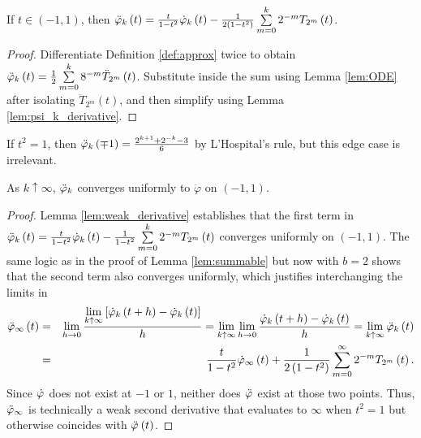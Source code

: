 \begin{lemma}
  \label{lem:second_derivative}
  If $t \in \left(-1,1\right)$, then $\ddotvarphi[t]{k} = \frac{t}{1 - t^2} \dotvarphi[t]{k} - \frac{1}{2\left(1 - t^2\right)} \sum\limits_{m = 0}^k 2^{-m} \TT[t]{m}$.
\end{lemma}
\begin{proof}
  Differentiate Definition \ref{def:approx} twice to obtain $\ddotvarphi[t]{k} = \frac{1}{2} \sum\limits_{m = 0}^k 8^{-m} \ddot{T}_{2^m}\left(t\right)$. Substitute inside the sum using Lemma \ref{lem:ODE} after isolating $\ddot{T}_{2^m}\left(t\right)$, and then simplify using Lemma \ref{lem:psi_k_derivative}.
 \end{proof}

\begin{remark*}
  If $t^2 = 1$, then $\ddotvarphi[\mp 1]{k} = \frac{2^{k + 1} + 2^{-k} - 3}{6}$ by L'Hospital's rule, but this edge case is irrelevant.
\end{remark*}

\begin{lemma}
  \label{lem:more_convergence}
  As $k \uparrow \infty$, $\ddotvarphi{k}$ converges uniformly to $\ddot{\varphi}$ on $\left(-1,1\right)$.
\end{lemma}
\begin{proof}
  Lemma \ref{lem:weak_derivative} establishes that the first term in $\ddotvarphi[t]{k} = \frac{t}{1 - t^2} \dotvarphi[t]{k} - \frac{1}{1 - t^2} \sum\limits_{m = 0}^k 2^{-m} \TT[t]{m}$ converges uniformly on $\left(-1, 1\right)$. The same logic as in the proof of Lemma \ref{lem:summable} but now with $b = 2$ shows that the second term also converges uniformly, which justifies interchanging the limits in
  \begin{eqnarray*}
  \ddotvarphi[t]{\infty} &=& \lim\limits_{h \rightarrow 0} \frac{\lim\limits_{k \uparrow \infty}\left[\dotvarphi[t + h]{k} - \dotvarphi[t]{k}\right]}{h} =
  \lim\limits_{k \uparrow \infty} \lim\limits_{h \rightarrow 0} \frac{\dotvarphi[t + h]{k} - \dotvarphi[t]{k}}{h} = \lim\limits_{k \uparrow \infty} \ddotvarphi[t]{k} \\
  &=& \frac{t}{1 - t^2} \dotvarphi[t]{\infty} + \frac{1}{2 \left(1 - t^2\right)} \sum\limits_{m = 0}^\infty 2^{-m} \TT[t]{m}.
  \end{eqnarray*}
  Since $\dotvarphi{}$ does not exist at $-1$ or $1$, neither does $\ddotvarphi{}$ exist at those two points. Thus, $\ddotvarphi[]{\infty}$ is technically a weak second derivative that evaluates to $\infty$ when $t^2 = 1$ but otherwise coincides with $\ddotvarphi[t]{}$.
\end{proof}

